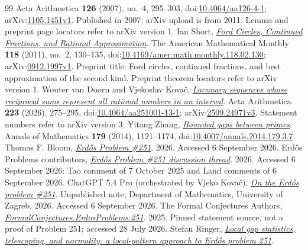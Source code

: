 \begin{thebibliography}{99}
  Acta Arithmetica \textbf{126} (2007), no.~4, 295--303, doi:\href{https://doi.org/10.4064/aa126-4-1}{10.4064/aa126-4-1}; arXiv:\href{https://arxiv.org/abs/1105.1451v1}{1105.1451v1}. Published in 2007; arXiv upload is from 2011. Lemma and preprint page locators refer to arXiv version 1.
 Ian Short, \href{https://arxiv.org/abs/0912.1997v1}{\emph{Ford Circles, Continued Fractions, and Rational Approximation}}.
  The American Mathematical Monthly \textbf{118} (2011), no.~2, 130--135, doi:\href{https://doi.org/10.4169/amer.math.monthly.118.02.130}{10.4169/amer.math.monthly.118.02.130}; arXiv:\href{https://arxiv.org/abs/0912.1997v1}{0912.1997v1}. Preprint title: Ford circles, continued fractions, and best approximation of the second kind. Preprint theorem locators refer to arXiv version 1.
 Wouter van Doorn and Vjekoslav Kova\v{c}, \href{https://arxiv.org/abs/2509.24971v3}{\emph{Lacunary sequences whose reciprocal sums represent all rational numbers in an interval}}.
  Acta Arithmetica \textbf{223} (2026), 275--295, doi:\href{https://doi.org/10.4064/aa251001-13-1}{10.4064/aa251001-13-1}; arXiv:\href{https://arxiv.org/abs/2509.24971v3}{2509.24971v3}. Statement numbers refer to arXiv version 3.
 Yitang Zhang, \href{https://doi.org/10.4007/annals.2014.179.3.7}{\emph{Bounded gaps between primes}}.
  Annals of Mathematics \textbf{179} (2014), 1121--1174, doi:\href{https://doi.org/10.4007/annals.2014.179.3.7}{10.4007/annals.2014.179.3.7}.
 Thomas F. Bloom, \href{https://www.erdosproblems.com/251}{\emph{Erd\H{o}s Problem \#251}}.
  2026. Accessed 6 September 2026.
 {Erdős Problems contributors}, \href{https://www.erdosproblems.com/forum/thread/251}{\emph{Erd\H{o}s Problem \#251 discussion thread}}.
  2026. Accessed 6 September 2026: Tao comment of 7 October 2025 and Land comments of 6 September 2026.
 {ChatGPT 5.4 Pro (orchestrated by Vjeko Kova\v{c})}, \href{https://web.math.pmf.unizg.hr/~vjekovac/files/Erdos_problem_251.pdf}{\emph{On the Erd\H{o}s problem \#251}}.
  Unpublished note, Department of Mathematics, University of Zagreb, 2026. Accessed 6 September 2026.
 {The Formal Conjectures Authors}, \href{https://github.com/google-deepmind/formal-conjectures/blob/f776d2f2039351b00737ffcafb9d7d7666e1d9af/FormalConjectures/ErdosProblems/251.lean}{\emph{FormalConjectures.ErdosProblems.251}}.
  2025. Pinned statement source, not a proof of Problem 251; accessed 28 July 2026.
 Stefan Ringer, \href{https://github.com/StefanRinger/erdos-251}{\emph{Local gap statistics, telescoping, and normality: a local-pattern approach to Erd\H{o}s problem 251}}.

\end{thebibliography}
